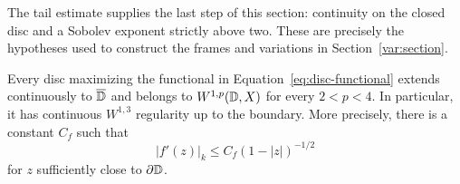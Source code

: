 The tail estimate supplies the last step of this section: continuity
on the closed disc and a Sobolev exponent strictly above two. These
are precisely the hypotheses used to construct the frames and
variations in Section~\ref{var:section}.
\begin{proposition}
\label{ex:regularity}
Every disc maximizing the functional in Equation~\eqref{eq:disc-functional}
extends continuously
to $\overline{\mathbb D}$ and belongs to $W^{1,p}(\mathbb D,X)$ for every $2<p<4$.
In particular, it has continuous $W^{1,3}$ regularity up to the
boundary. More precisely, there is a constant $C_f$ such that
\begin{equation}
 |f'(z)|_k\leq C_f(1-|z|)^{-1/2}
 \label{eq:boundary-derivative}
\end{equation}
for $z$ sufficiently close to $\partial\mathbb D$.
\end{proposition}

